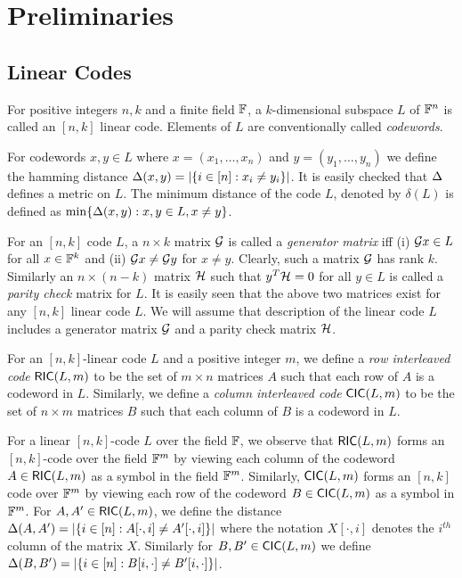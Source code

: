 \section{Preliminaries}\label{sec:prelims}
\subsection{Linear Codes}
\begin{definition}\label{defn:lincode}
For positive integers $n,k$ and a finite field $\mathbb{F}$, a $k$-dimensional subspace $L$ of $\mathbb{F}^n$ is called an $[n,k]$ linear code. Elements of $L$ are conventionally called {\em codewords}. 
\end{definition}

For codewords $x,y\in L$ where $x=(x_1,\ldots,x_n)$ and $y=(y_1,\ldots,y_n)$ we define the hamming distance $\Delta(x,y)=|\{i\in [n]: x_i\neq y_i\}|$. It is easily checked that $\Delta$ defines a metric on $L$. The minimum distance of the code $L$, denoted by $\delta(L)$ is defined as $\min\{\Delta(x,y):x,y\in L, x\neq y\}$.

For an $[n,k]$ code $L$, a $n\times k$ matrix $\mathcal{G}$ is called a {\em generator matrix} iff (i) $\mathcal{G} x\in L$ for all $x \in \mathbb{F}^k$ and (ii) $\mathcal{G} x\neq \mathcal{G} y$ for $x\neq y$. Clearly, such a matrix $\mathcal{G}$ has rank $k$. Similarly an $n\times (n-k)$ matrix $\mathcal{H}$ such that $y^T \mathcal{H} = 0$ for all $y\in L$ is called a {\em parity check} matrix for $L$. It is easily seen that the above two matrices exist for any $[n,k]$ linear code $L$. We will assume that description of the linear code $L$ includes a generator matrix $\mathcal{G}$ and a parity check matrix $\mathcal{H}$.

\begin{definition}\label{defn:interleavedcode}
For an $[n,k]$-linear code $L$ and a positive integer $m$, we define a {\em row interleaved code} $\mathsf{RIC}(L,m)$ to be the set of $m\times n$ matrices $A$ such that each row of $A$ is a codeword in $L$. Similarly, we define a {\em column interleaved code} $\mathsf{CIC}(L,m)$ to be the set of $n\times m$ matrices $B$ such that each column of $B$ is a codeword in $L$.
\end{definition}

For a linear $[n,k]$-code $L$ over the field $\mathbb{F}$, we observe that $\mathsf{RIC}(L,m)$ forms an $[n,k]$-code over the field $\mathbb{F}^m$ by viewing each column of the codeword $A\in \mathsf{RIC}(L,m)$ as a symbol in the field $\mathbb{F}^m$. Similarly, $\mathsf{CIC}(L,m)$ forms an $[n,k]$ code over $\mathbb{F}^m$ by viewing each row of the codeword $B\in \mathsf{CIC}(L,m)$ as a symbol in $\mathbb{F}^m$. For $A,A'\in \mathsf{RIC}(L,m)$, we define the distance $\Delta(A,A')=|\{i\in [n]: A[\cdot,i]\neq A'[\cdot,i]\}|$ where the notation $X[\cdot,i]$ denotes the $i^{th}$ column of the matrix $X$. Similarly for $B,B'\in \mathsf{CIC}(L,m)$ we define $\Delta(B,B')=|\{i\in [n]: B[i,\cdot]\neq B'[i,\cdot]\}|$.
 
